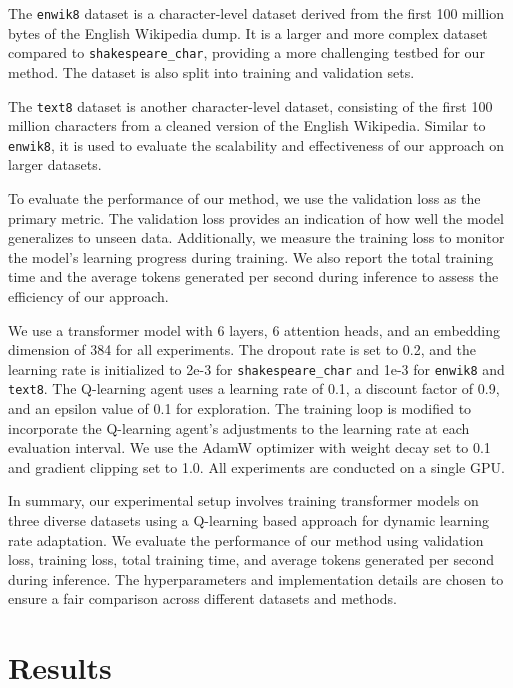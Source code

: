 \documentclass{article} %
\begin{document}
The \texttt{enwik8} dataset is a character-level dataset derived from the first 100 million bytes of the English Wikipedia dump. It is a larger and more complex dataset compared to \texttt{shakespeare\_char}, providing a more challenging testbed for our method. The dataset is also split into training and validation sets.

The \texttt{text8} dataset is another character-level dataset, consisting of the first 100 million characters from a cleaned version of the English Wikipedia. Similar to \texttt{enwik8}, it is used to evaluate the scalability and effectiveness of our approach on larger datasets.

To evaluate the performance of our method, we use the validation loss as the primary metric. The validation loss provides an indication of how well the model generalizes to unseen data. Additionally, we measure the training loss to monitor the model's learning progress during training. We also report the total training time and the average tokens generated per second during inference to assess the efficiency of our approach.

We use a transformer model with 6 layers, 6 attention heads, and an embedding dimension of 384 for all experiments. The dropout rate is set to 0.2, and the learning rate is initialized to 2e-3 for \texttt{shakespeare\_char} and 1e-3 for \texttt{enwik8} and \texttt{text8}. The Q-learning agent uses a learning rate of 0.1, a discount factor of 0.9, and an epsilon value of 0.1 for exploration. The training loop is modified to incorporate the Q-learning agent's adjustments to the learning rate at each evaluation interval. We use the AdamW optimizer \citep{loshchilov2017adamw} with weight decay set to 0.1 and gradient clipping set to 1.0. All experiments are conducted on a single GPU.

In summary, our experimental setup involves training transformer models on three diverse datasets using a Q-learning based approach for dynamic learning rate adaptation. We evaluate the performance of our method using validation loss, training loss, total training time, and average tokens generated per second during inference. The hyperparameters and implementation details are chosen to ensure a fair comparison across different datasets and methods.

\section{Results}
\label{sec:results}
\end{document}
